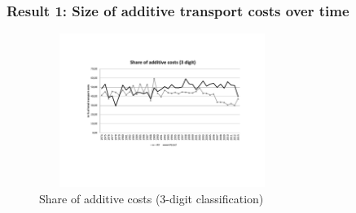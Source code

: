 \documentclass[10 pt,Helvetica, french]{beamer}
\begin{document}
\begin{frame}[label = slide_result1_more]
\frametitle{Result 1: Size of additive transport costs over time}

\begin{figure}[htbp]
\caption{Share of additive costs (3-digit classification)}
\label{fig:part_cout_additif}
\begin{center}
\includegraphics[width=8cm, height=5cm]{part_cout_additif.pdf}
\end{center}
\end{figure}

 \end{frame}

\end{document}
